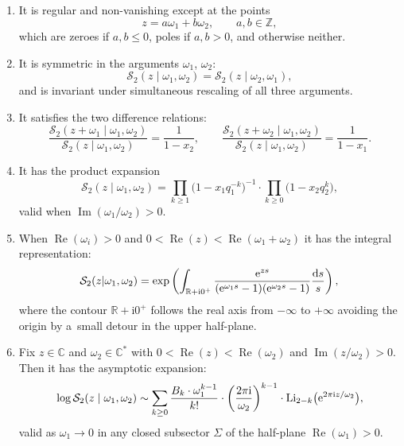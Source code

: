 \documentclass[pdftex]{sigma}
\numberwithin{equation}{section}
\begin{document}
\begin{enumerate}\itemsep=0pt
 \item It is regular and non-vanishing except at the points
 \begin{equation*}
 z=a \omega_1 + b\omega_2,\qquad a,b \in \mathbb{Z},
 \end{equation*}
 which are zeroes if $a,b\le 0$, poles if $a,b>0$, and otherwise neither.
 \item It is symmetric in the arguments $\omega_1$, $\omega_2$:
 \begin{equation*} \mathcal{S}_2(z\mid \omega_1,\omega_2)=\mathcal{S}_2(z\mid \omega_2,\omega_1),
 \end{equation*}
 and is invariant under simultaneous rescaling of all three arguments.
 \item It satisfies the two difference relations:
 \begin{equation}\label{qddiffeq} \frac{\mathcal{S}_2(z+\omega_1\mid \omega_1,\omega_2)}{\mathcal{S}_2(z\mid \omega_1,\omega_2)}= \frac{1}{1-x_2}, \qquad \frac{\mathcal{S}_2(z+\omega_2\mid \omega_1,\omega_2)}{\mathcal{S}_2(z\mid \omega_1,\omega_2)}= \frac{1}{1-x_1}.
 \end{equation}
 \item It has the product expansion
\begin{equation}\label{S2prod} \mathcal{S}_2(z\mid \omega_1,\omega_2)= \prod_{k\ge 1} \big(1-x_1 q_1^{-k}\big)^{-1} \cdot \prod_{k\ge 0} \big(1-x_2 q_2^{k}\big),
 \end{equation}
valid when $\operatorname{Im}(\omega_1/\omega_2) >0.$

\item When $\operatorname{Re}(\omega_i)>0$ and $0<\operatorname{Re}(z)< \operatorname{Re}(\omega_1+\omega_2)$ it has the integral representation:
\begin{equation}\label{S2int} \mathcal{S}_2(z|\omega_1,\omega_2)= \exp \left( \int_{\mathbb{R}+\mathrm{i} 0^{+}} \frac{{\rm e}^{zs}}{({\rm e}^{\omega_1s}-1)({\rm e}^{\omega_2 s}-1)} \frac{{\rm d}s}{s}\right),
\end{equation}
where the contour $\mathbb{R}+\mathrm{i} 0^{+}$ follows the real axis from $-\infty$ to $+\infty$ avoiding the origin by a~small detour in the upper half-plane.

\item Fix $z\in\mathbb{C}$ and $\omega_2\in \mathbb{C}^*$ with $0<\operatorname{Re}(z)<\operatorname{Re}(\omega_2)$ and $\operatorname{Im}(z/\omega_2)>0$. Then it has the asymptotic expansion:
\begin{equation}\label{S2asymp} \log \mathcal{S}_2(z\mid \omega_1,\omega_2) \sim \sum_{k\ge0} \frac{B_k \cdot \omega_1^{k-1}}{k!} \cdot \left( \frac{2\pi \mathrm{i}}{\omega_2}\right)^{k-1} \cdot {\rm Li}_{2-k}\big({\rm e}^{2\pi \mathrm{i} z/\omega_2}\big),
\end{equation}
valid as $\omega_1\rightarrow 0$ in any closed subsector $\Sigma$ of the half-plane $\operatorname{Re}(\omega_1)>0$.
\end{enumerate}
\end{document}
